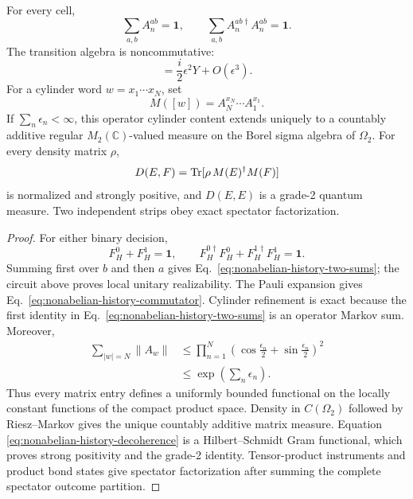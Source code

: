\begin{theorem}
\label{thm:nonabelian-history-extension}
For every cell,
\begin{equation}
 \sum_{a,b}A_n^{ab}=\mathbf 1,
 \qquad
 \sum_{a,b}A_n^{ab\dagger}A_n^{ab}=\mathbf 1.
 \label{eq:nonabelian-history-two-sums}
\end{equation}
The transition algebra is noncommutative:
\begin{equation}
 [A^{00},A^{10}]=\frac{i}{2}\epsilon^2Y+O(\epsilon^3).
 \label{eq:nonabelian-history-commutator}
\end{equation}
For a cylinder word \(w=x_1\cdots x_N\), set
\[
 M([w])=A_N^{x_N}\cdots A_1^{x_1}.
\]
If \(\sum_n\epsilon_n<\infty\), this operator cylinder content extends
uniquely to a countably additive regular
\(M_2(\mathbb C)\)-valued measure on the Borel sigma algebra of
\(\Omega_2\).  For every density matrix \(\rho\),
\begin{equation}
 D(E,F)=\operatorname{Tr}[\rho\,M(E)^\dagger M(F)]
 \label{eq:nonabelian-history-decoherence}
\end{equation}
is normalized and strongly positive, and \(D(E,E)\) is a grade-2 quantum
measure.  Two independent strips obey exact spectator factorization.
\end{theorem}

\begin{proof}
For either binary decision,
\[
 F_H^0+F_H^1=\mathbf 1,\qquad
 F_H^{0\dagger}F_H^0+F_H^{1\dagger}F_H^1=\mathbf 1.
\]
Summing first over \(b\) and then \(a\) gives
Eq.~\eqref{eq:nonabelian-history-two-sums}; the circuit above proves local
unitary realizability.  The Pauli expansion gives
Eq.~\eqref{eq:nonabelian-history-commutator}.  Cylinder refinement is exact
because the first identity in
Eq.~\eqref{eq:nonabelian-history-two-sums} is an operator Markov sum.
Moreover,
\begin{align}
 \sum_{|w|=N}\|A_w\|
 &\le
 \prod_{n=1}^{N}
 \left(\cos\frac{\epsilon_n}{2}
      +\sin\frac{\epsilon_n}{2}\right)^2\nonumber\\
 &\le \exp\!\left(\sum_n\epsilon_n\right).
 \label{eq:nonabelian-history-variation}
\end{align}
Thus every matrix entry defines a uniformly bounded functional on the
locally constant functions of the compact product space.  Density in
\(C(\Omega_2)\) followed by Riesz--Markov gives the unique countably
additive matrix measure.  Equation
\eqref{eq:nonabelian-history-decoherence} is a Hilbert--Schmidt Gram
functional, which proves strong positivity and the grade-2 identity.
Tensor-product instruments and product bond states give spectator
factorization after summing the complete spectator outcome partition.
\end{proof}

